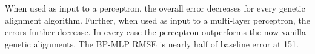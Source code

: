 \label{conclusion}

When used as input to a perceptron, the overall error decreases for every genetic alignment algorithm. Further, when used as input to a multi-layer perceptron, the errors further decrease. In every case the perceptron outperforms the now-vanilla genetic alignments. The BP-MLP RMSE is nearly half of baseline error at 151.

